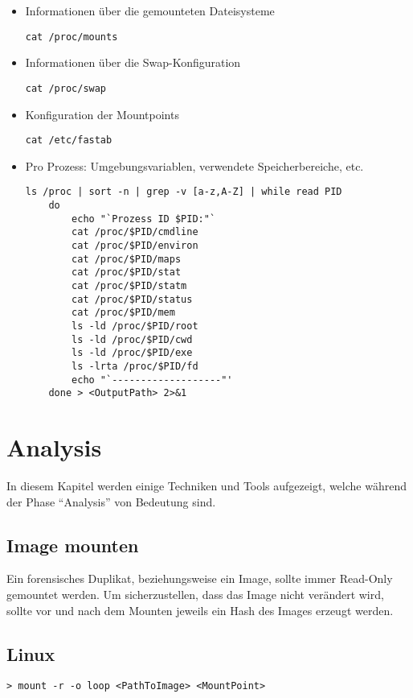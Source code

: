 \begin{itemize}
\item  Informationen über die gemounteten Dateisysteme
\begin{lstlisting}
cat /proc/mounts
\end{lstlisting}

\item  Informationen über die Swap-Konfiguration
\begin{lstlisting}
cat /proc/swap
\end{lstlisting}

\item  Konfiguration der Mountpoints
\begin{lstlisting}
cat /etc/fastab
\end{lstlisting}

\item  Pro Prozess: Umgebungsvariablen, verwendete Speicherbereiche, etc.
\begin{lstlisting}
ls /proc | sort -n | grep -v [a-z,A-Z] | while read PID
	do
		echo "`Prozess ID $PID:"`
		cat /proc/$PID/cmdline
		cat /proc/$PID/environ
		cat /proc/$PID/maps
		cat /proc/$PID/stat
		cat /proc/$PID/statm
		cat /proc/$PID/status
		cat /proc/$PID/mem
		ls -ld /proc/$PID/root
		ls -ld /proc/$PID/cwd
		ls -ld /proc/$PID/exe
		ls -lrta /proc/$PID/fd
		echo "`-------------------"'
	done > <OutputPath> 2>&1
\end{lstlisting}
\end{itemize}





\section{Analysis}
In diesem Kapitel werden einige Techniken und Tools aufgezeigt, welche während der Phase "`Analysis"' von Bedeutung sind. 



\subsection{Image mounten}
Ein forensisches Duplikat, beziehungsweise ein Image, sollte immer Read-Only gemountet werden. Um sicherzustellen, dass das Image nicht verändert wird, sollte vor und nach dem Mounten jeweils ein Hash des Images erzeugt werden.

\subsection{Linux}
\begin{lstlisting}
> mount -r -o loop <PathToImage> <MountPoint>
\end{lstlisting}



